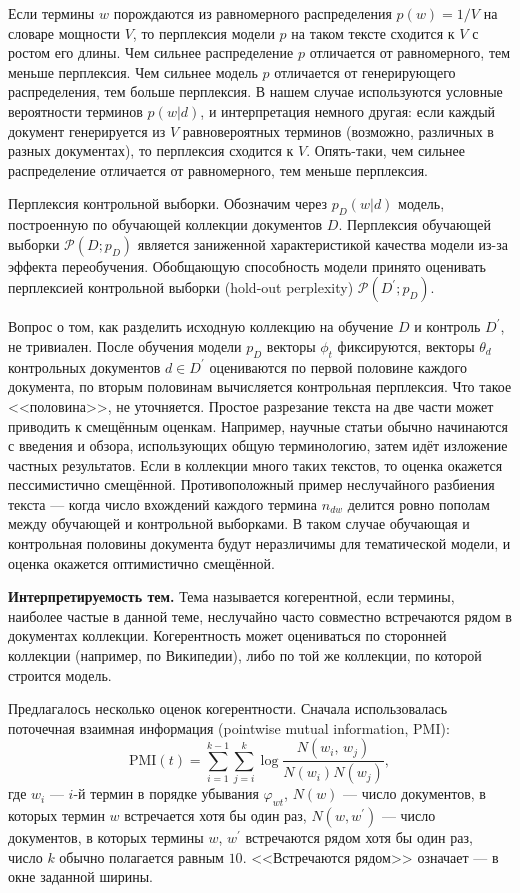 \documentclass[article, 10pt]{disser}
\begin{document}
Если термины $w$ порождаются из равномерного распределения $p(w) = 1/V$ на словаре мощности $V$, то перплексия модели $p$ на таком тексте сходится к $V$ с ростом его длины. Чем сильнее распределение $p$ отличается от равномерного, тем меньше перплексия. Чем сильнее модель $p$ отличается от генерирующего распределения, тем больше перплексия. В нашем случае используются условные вероятности терминов $p(w | d)$, и интерпретация немного другая: если каждый документ генерируется из $V$ равновероятных терминов (возможно, различных в разных документах), то перплексия сходится к $V$. Опять-таки, чем сильнее распределение отличается от равномерного, тем меньше перплексия.

Перплексия контрольной выборки. Обозначим через $p_D(w | d)$ модель, построенную по обучающей коллекции документов $D$. Перплексия обучающей выборки $\mathcal{P}(D; p_D)$ является заниженной характеристикой качества модели из-за эффекта переобучения. Обобщающую способность модели принято оценивать перплексией контрольной выборки (hold-out perplexity) $\mathcal{P}(D^{'}; p_D)$.

Вопрос о том, как разделить исходную коллекцию на обучение $D$ и контроль $D^{′}$, не тривиален. После обучения модели $p_D$ векторы $\phi_t$ фиксируются, векторы $\theta_d$ контрольных документов $d \in D^{′}$ оцениваются по первой половине каждого документа, по вторым половинам вычисляется контрольная перплексия. Что такое <<половина>>, не уточняется. Простое разрезание текста на две части может приводить к смещённым оценкам. Например, научные статьи обычно начинаются с введения и обзора, использующих общую терминологию, затем идёт изложение частных результатов. Если в коллекции много таких текстов, то оценка окажется пессимистично смещённой. Противоположный пример неслучайного разбиения текста --- когда число вхождений каждого термина $n_{dw}$ делится ровно пополам между обучающей и контрольной выборками. В таком случае обучающая и контрольная половины документа будут неразличимы для тематической модели, и оценка окажется оптимистично смещённой.

\textbf{Интерпретируемость тем.} Тема называется когерентной, если термины, наиболее частые в данной теме, неслучайно часто совместно встречаются рядом в документах коллекции. Когерентность может оцениваться по сторонней коллекции (например, по Википедии), либо по той же коллекции, по которой строится модель.

Предлагалось несколько оценок когерентности. Сначала использовалась поточечная взаимная информация (pointwise mutual information, PMI):
\begin{equation*}
    \text{PMI}(t) = \sum\limits_{i=1}^{k-1}\sum\limits_{j =i}^{k}\log\frac{N(w_i,\,w_j)}{N(w_i)N(w_j)},
\end{equation*}
где $w_i$ --- $i$-й термин в порядке убывания $\varphi_{wt}$, $N(w)$ --- число документов, в которых термин $w$ встречается хотя бы один раз, $N(w, w^{'})$ --- число документов, в которых термины $w$, $w^{'}$ встречаются рядом хотя бы один раз, число $k$ обычно полагается равным $10$. <<Встречаются рядом>> означает --- в окне заданной ширины.
\end{document}
